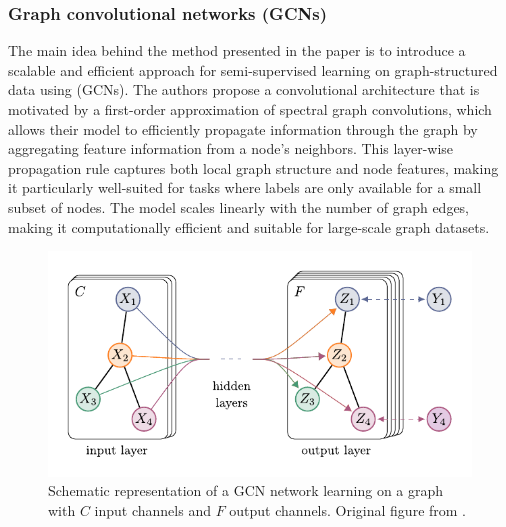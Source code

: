\subsubsection{Graph convolutional networks (GCNs)}

The main idea behind the method presented in the paper \cite{kipf_semi-supervised_2017} is to introduce a scalable and efficient approach for semi-supervised learning on graph-structured data using  (GCNs). The authors propose a convolutional architecture that is motivated by a first-order approximation of spectral graph convolutions, which allows their model to efficiently propagate information through the graph by aggregating feature information from a node's neighbors. This layer-wise propagation rule captures both local graph structure and node features, making it particularly well-suited for tasks where labels are only available for a small subset of nodes. The model scales linearly with the number of graph edges, making it computationally efficient and suitable for large-scale graph datasets.

\begin{figure}
	\includegraphics[width=0.8\linewidth]{images/GCN.pdf}
	\caption{Schematic representation of a GCN network learning on a graph with \( C \) input channels and \( F \) output channels. Original figure from \cite{kipf_semi-supervised_2017}.}
	\label{fig:GCN}
\end{figure}

